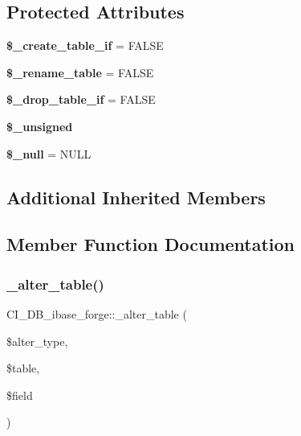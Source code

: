 \subsection*{Protected Attributes}
\begin{DoxyCompactItemize}
\item 
\mbox{\label{class_c_i___d_b__ibase__forge_a0c566b2e2333357ca25e1aa0f1acba98}} 
{\bfseries \$\+\_\+create\+\_\+table\+\_\+if} = F\+A\+L\+SE
\item 
\mbox{\label{class_c_i___d_b__ibase__forge_ad0532dcc997596f9f80725f29b81ea5a}} 
{\bfseries \$\+\_\+rename\+\_\+table} = F\+A\+L\+SE
\item 
\mbox{\label{class_c_i___d_b__ibase__forge_a7617c799ee4b309b9d40fceb34ed099e}} 
{\bfseries \$\+\_\+drop\+\_\+table\+\_\+if} = F\+A\+L\+SE
\item 
{\bfseries \$\+\_\+unsigned}
\item 
\mbox{\label{class_c_i___d_b__ibase__forge_ab3d19bf7ae121c619925f474124f12ff}} 
{\bfseries \$\+\_\+null} = \textquotesingle{}N\+U\+LL\textquotesingle{}
\end{DoxyCompactItemize}
\subsection*{Additional Inherited Members}


\subsection{Member Function Documentation}
\mbox{\label{class_c_i___d_b__ibase__forge_a6afc8d51475bfabf0d5b2b1c51ae0fd6}} 
\subsubsection{\texorpdfstring{\+\_\+alter\+\_\+table()}{\_alter\_table()}}
{\footnotesize\ttfamily C\+I\+\_\+\+D\+B\+\_\+ibase\+\_\+forge\+::\+\_\+alter\+\_\+table (\begin{DoxyParamCaption}\item[{}]{\$alter\+\_\+type,  }\item[{}]{\$table,  }\item[{}]{\$field }\end{DoxyParamCaption})\hspace{0.3cm}{\ttfamily [protected]}}

